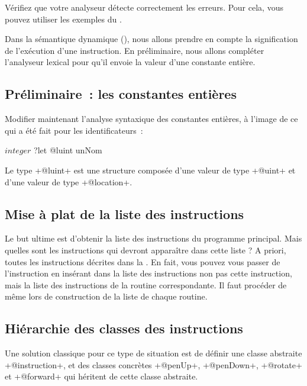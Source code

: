 Vérifiez que votre analyseur détecte correctement les erreurs. Pour cela, vous pouvez utiliser les exemples du .









Dans la sémantique dynamique (), nous allons prendre en compte la signification de l'exécution d'une instruction. En préliminaire, nous allons compléter l'analyseur lexical pour qu'il envoie la valeur d'une constante entière.

\subsection{Préliminaire~: les constantes entières}

Modifier maintenant l’analyse syntaxique des constantes entières, à l’image de ce qui a été fait pour les identificateurs~:
\begin{galgas}
$integer$ ?let @luint unNom
\end{galgas}

Le type \ggs+@luint+ est une structure composée d’une valeur de type \ggs+@uint+ et d’une valeur de type \ggs+@location+.

\subsection{Mise à plat de la liste des instructions}
Le but ultime est d'obtenir la liste des instructions du programme principal. Mais quelles sont les instructions qui devront apparaître dans cette liste ? A priori, toutes les instructions décrites dans la . En fait, vous pouvez vous passer de l'instruction  en insérant dans la liste des instructions non pas cette instruction, mais la liste des instructions de la routine correspondante. Il faut procéder de même lors de construction de la liste de chaque routine.

\subsection{Hiérarchie des classes des instructions}
Une solution classique pour ce type de situation est de définir une classe abstraite \ggs+@instruction+, et des classes concrètes \ggs+@penUp+, \ggs+@penDown+, \ggs+@rotate+ et \ggs+@forward+ qui héritent de cette classe abstraite.

